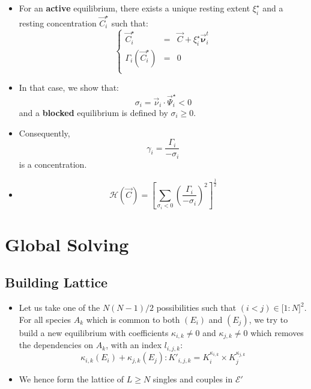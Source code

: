 \documentclass[aps,12pt]{revtex4}
\begin{document}
\begin{itemize}
\item For an {\bf active} equilibrium, there exists a unique resting extent $\xi_i^\star$ and a resting concentration $\vec{C}_i^\star$ such that:
\begin{equation}
\left\lbrace
\begin{array}{rcl}
	\vec{C}_i^\star & = & \vec{C} + \xi_i^\star \vec{\bm{\nu}}^t_i\\
	\Gamma_i(\vec{C}_i^\star) & = & 0 \\
\end{array}
\right.
\end{equation}

\item In that case, we show that:
\begin{equation}
	\sigma_i = \vec{\nu}_i \cdot \vec{\Psi}_i^\star < 0
\end{equation}	
and a {\bf blocked} equilibrium is defined by $\sigma_i\geq 0$.

\item Consequently,
\begin{equation}
	\gamma_i = \dfrac{\Gamma_i}{-\sigma_i} 
\end{equation}
is a concentration.

\item \begin{equation}
\mathcal{H}(\vec{C}) = \left\lbrack\sum_{\sigma_i<0} \left(\dfrac{\Gamma_i}{-\sigma_i}\right)^2 \right\rbrack^{\frac{1}{2}}
\end{equation}

 
\end{itemize}
 
\section{Global Solving}

\subsection{Building Lattice}

\begin{itemize}
\item
Let us take one of the $N(N-1)/2$ possibilities such that $(i<j) \in \lbrack1:N\rbrack^2$.
For all species $A_k$ which is common to both $(E_i)$ and $(E_j)$, we try to build a
new equilibrium with coefficients $\kappa_{i,k}\not=0$ and $\kappa_{j,k}\not=0$ which removes the
dependencies on $A_k$, with an index $l_{i,j,k}$:
\begin{equation}
	\kappa_{i,k} (E_i) + \kappa_{j,k} (E_j) : K'_{i,j,k} = K_i^{\kappa_{i,k}} \times K_j^{\kappa_{j,k}}
\end{equation}

\item We hence form the lattice of $L \geq N$ singles and couples in $\mathcal{E}'$
\end{itemize}
\end{document}
